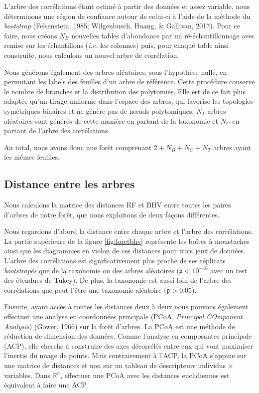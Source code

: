 \documentclass[12pt,a4paper]{reedthesis}
\newcommand \RR {\mathbb{R}}
\newcommand \pv {\mathfrak{p}}
\theoremstyle{definition}
\theoremstyle{definition}
\theoremstyle{definition}
\theoremstyle{remark}
\begin{document}
L'arbre des corrélations étant estimé à partir des données et assez variable, nous déterminons une région de confiance autour de celui-ci à l'aide de la méthode du \emph{bootstrap} (Felsenstein, 1985; Wilgenbusch, Huang, \& Gallivan, 2017). Pour ce faire, nous créons \(N_B\) nouvelles tables d'abondance par un ré-échantillonnage avec remise sur les échantillons (\emph{i.e.} les colonnes) puis, pour chaque table ainsi construite, nous calculons un nouvel arbre de corrélation.

Nous générons également des arbres aléatoires, sous l'hypothèse nulle, en permutant les labels des feuilles d'un arbre de référence. Cette procédure conserve le nombre de branches et la distribution des polytomies. Elle est de ce fait plus adaptée qu'un tirage uniforme dans l'espace des arbres, qui favorise les topologies symétriques binaires et ne génère pas de nœuds polytomiques. \(N_T\) arbres aléatoires sont générés de cette manière en partant de la taxonomie et \(N_C\) en partant de l'arbre des corrélations.

Au total, nous avons donc une forêt comprenant \(2 + N_B + N_C + N_T\) arbres ayant les mêmes feuilles.

\hypertarget{distance-entre-les-arbres}{%
\subsection{Distance entre les arbres}\label{distance-entre-les-arbres}}

Nous calculons la matrice des distances RF et BHV entre toutes les paires d'arbres de notre forêt, que nous exploitons de deux façons différentes.

Nous regardons d'abord la distance entre chaque arbre et l'arbre des corrélations. La partie supérieure de la figure \ref{fig:foretbhv} représente les boîtes à moustaches ainsi que les diagrammes en violon de ces distances pour trois jeux de données. L'arbre des corrélations est significativement plus proche de ses réplicats \emph{bootstrapés} que de la taxonomie ou des arbres aléatoires (\(\pv<10^{-16}\) avec un test des étendues de Tukey). De plus, la taxonomie est aussi loin de l'arbre des corrélations que peut l'être une taxonomie aléatoire (\(\pv > 0.05\)).

Ensuite, ayant accès à toutes les distances deux à deux nous pouvons également effectuer une analyse en coordonnées principale (PCoA, \emph{Principal COmponent Analysis}) (Gower, 1966) sur la forêt d'arbres. La PCoA est une méthode de réduction de dimension des données. Comme l'analyse en composantes principale (ACP), elle cherche à construire des axes décorrélés entre eux qui vont maximiser l'inertie du nuage de points. Mais contrairement à l'ACP, la PCoA s'appuie sur une matrice de distances et non sur un tableau de descripteurs individus \(\times\) variables. Dans \(\RR^n\), effectuer une PCoA avec les distances euclidiennes est équivalent à faire une ACP.
\end{document}
